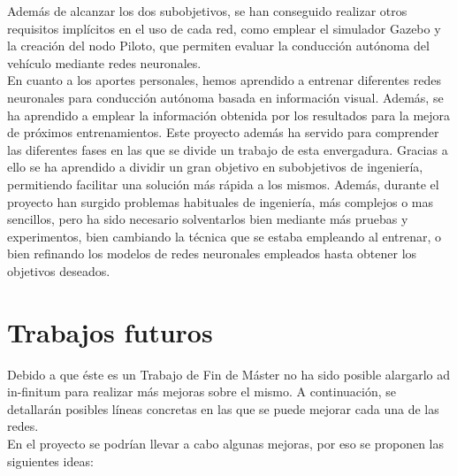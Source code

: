 Además de alcanzar los dos subobjetivos, se han conseguido realizar otros requisitos implícitos en el uso de cada red, como emplear el simulador Gazebo y la creación del nodo Piloto, que permiten evaluar la conducción autónoma del vehículo mediante redes neuronales.\\

En cuanto a los aportes personales, hemos aprendido a entrenar diferentes redes neuronales para conducción autónoma basada en información visual. Además, se ha aprendido a emplear la información obtenida por los resultados para la mejora de próximos entrenamientos. Este proyecto además ha servido para comprender las diferentes fases en las que se divide un trabajo de esta envergadura. Gracias a ello se ha aprendido a dividir un gran objetivo en subobjetivos de ingeniería, permitiendo facilitar una solución más rápida a los mismos. Además, durante el proyecto han surgido problemas habituales de ingeniería, más complejos o mas sencillos, pero ha sido necesario solventarlos bien mediante más pruebas y experimentos, bien cambiando la técnica que se estaba empleando al entrenar, o bien refinando los modelos de redes neuronales empleados hasta obtener los objetivos deseados.\\


\section{Trabajos futuros}

Debido a que éste es un Trabajo de Fin de Máster no ha sido posible alargarlo ad in-finitum para realizar más mejoras sobre el mismo. A continuación, se detallarán posibles líneas concretas en las que se puede mejorar cada una de las redes.\\

En el proyecto se podrían llevar a cabo algunas mejoras, por eso se proponen las siguientes ideas:

